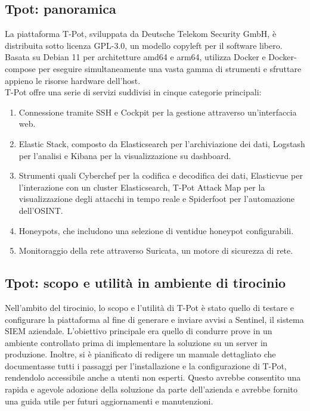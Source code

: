 \documentclass[12pt,a4paper,oneside,onecolumn,openright]{book}
\begin{document}
\subsection{Tpot: panoramica}
La piattaforma T-Pot, sviluppata da Deutsche Telekom Security GmbH, è distribuita 
sotto licenza GPL-3.0, un modello copyleft per il software libero. 
Basata su Debian 11 per architetture amd64 e arm64, utilizza Docker e Docker-compose 
per eseguire simultaneamente una vasta gamma di strumenti e sfruttare appieno le 
risorse hardware dell'host. \\
T-Pot offre una serie di servizi suddivisi in cinque categorie principali:
\begin{enumerate}
	\item Connessione tramite SSH e Cockpit per la gestione attraverso un'interfaccia web. 
	\item Elastic Stack, composto da Elasticsearch per l'archiviazione dei dati, Logstash per l'analisi e Kibana per la visualizzazione su dashboard.
	\item Strumenti quali Cyberchef per la codifica e decodifica dei dati, Elasticvue per l'interazione con un cluster Elasticsearch, T-Pot Attack Map per la visualizzazione degli attacchi in tempo reale e Spiderfoot per l'automazione dell'OSINT.
	\item Honeypots, che includono una selezione di ventidue honeypot configurabili.
	\item Monitoraggio della rete attraverso Suricata, un motore di sicurezza di rete.
\end{enumerate}

\subsection{Tpot: scopo e utilità in ambiente di tirocinio}
Nell'ambito del tirocinio, lo scopo e l'utilità di T-Pot è stato quello di testare e 
configurare la piattaforma al fine di generare e inviare avvisi a Sentinel, il sistema 
SIEM aziendale. L'obiettivo principale era quello di condurre prove in un ambiente 
controllato prima di implementare la soluzione su un server in produzione. 
Inoltre, si è pianificato di redigere un manuale dettagliato che documentasse tutti i 
passaggi per l'installazione e la configurazione di T-Pot, rendendolo accessibile anche 
a utenti non esperti. Questo avrebbe consentito una rapida e agevole adozione della 
soluzione da parte dell'azienda e avrebbe fornito una guida utile per futuri aggiornamenti e manutenzioni.
\newpage
\end{document}
